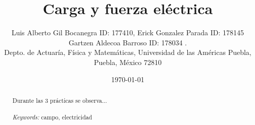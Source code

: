 \documentclass{article}
\begin{document}

\renewcommand{\footrulewidth}{1pt}
\renewcommand{\tablename}{Tabla}
\renewcommand{\figurename}{Figura}


\title{Carga y fuerza eléctrica}
\author{\small{Luis Alberto Gil Bocanegra ID: 177410, Erick Gonzalez Parada ID: 178145}\\
 \small{Gartzen Aldecoa Barroso ID: 178034 .}\\		%
	   \small{Depto. de Actuaría, Física y Matemáticas, Universidad de las Américas Puebla, Puebla, M\'exico 72810}}
\date{\small{\today}}

\maketitle


\begin{abstract}
	Durante las 3 prácticas se observa...	
\\
\\
{\it Keywords:}  campo, electricidad  
\\
\\
\end{abstract}

\end{document}
